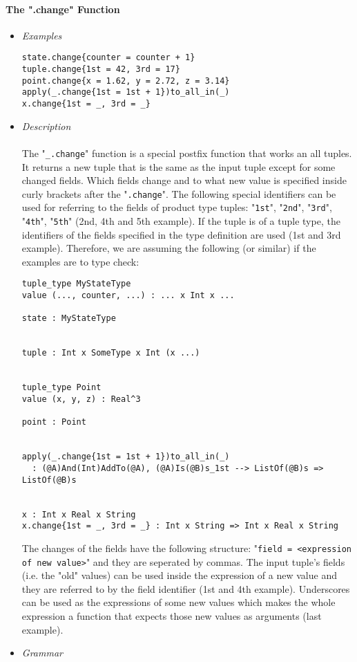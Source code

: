 \documentclass{article}
\begin{document}
\paragraph{The ".change" Function}

\begin{itemize}

\item \textit{Examples}

\begin{verbatim}
state.change{counter = counter + 1}
tuple.change{1st = 42, 3rd = 17}
point.change{x = 1.62, y = 2.72, z = 3.14}
apply(_.change{1st = 1st + 1})to_all_in(_)
x.change{1st = _, 3rd = _}
\end{verbatim}

\item \textit{Description}
\\\\
The "\verb|_.change|" function is a special postfix function that works an all
tuples. It returns a new tuple that is the same as the input tuple except for
some changed fields. Which fields change and to what new value is specified
inside curly brackets after the "\verb|.change|". The following special
identifiers can be used for referring to the fields of product type tuples:
"\verb|1st|", "\verb|2nd|", "\verb|3rd|", "\verb|4th|", "\verb|5th|"
(2nd, 4th and 5th example). If the tuple is of a tuple type, the identifiers of
the fields specified in the type definition are used (1st and 3rd example).
Therefore, we are assuming the following (or similar) if the examples are to
type check:

\begin{verbatim}
tuple_type MyStateType
value (..., counter, ...) : ... x Int x ...

state : MyStateType


tuple : Int x SomeType x Int (x ...)


tuple_type Point
value (x, y, z) : Real^3

point : Point


apply(_.change{1st = 1st + 1})to_all_in(_)
  : (@A)And(Int)AddTo(@A), (@A)Is(@B)s_1st --> ListOf(@B)s => ListOf(@B)s


x : Int x Real x String
x.change{1st = _, 3rd = _} : Int x String => Int x Real x String
\end{verbatim}
The changes of the fields have the following structure:
"\verb|field = <expression of new value>|"
and they are seperated by commas. The input tuple's fields (i.e. the
"old" values) can be used inside the expression of a new value and they are
referred to by the field identifier (1st and 4th example). Underscores can be
used as the expressions of some new values which makes the whole expression
a function that expects those new values as arguments (last example).
\item \textit{Grammar}


\end{itemize}
\end{document}

